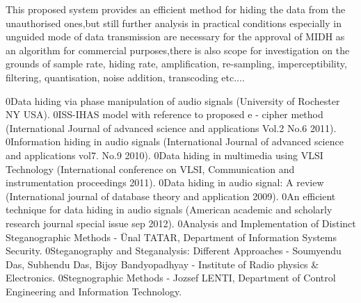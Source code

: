 \documentclass[a4paper, 12pt, notitlepage]{report}
\begin{document}
This  proposed  system  provides  an  efficient  method  for hiding  the  data  from  the  unauthorised ones,but still further analysis in practical conditions especially in unguided mode of data transmission are necessary for the approval of MIDH as an algorithm for commercial purposes,there is also scope for investigation on the grounds of sample rate, hiding rate, amplification, re-sampling, imperceptibility, filtering, quantisation, noise addition, transcoding etc....

\begin{thebibliography}{breitestes Label}

\bibitem 0Data hiding via phase manipulation of audio signals (University of Rochester NY USA).
\bibitem 0ISS-IHAS model with reference to proposed e - cipher method  (International Journal of advanced science and applications Vol.2 No.6 2011).
\bibitem 0Information hiding in audio signals (International Journal of advanced science and applications vol7. No.9 2010).
\bibitem 0Data hiding in multimedia using VLSI Technology (International conference on VLSI, Communication and instrumentation proceedings 2011).
\bibitem 0Data hiding in audio signal: A review (International journal of database theory and application 2009).
\bibitem 0An efficient technique for data hiding in audio signals (American academic and scholarly research journal special issue sep 2012).
\bibitem 0Analysis and Implementation of Distinct Steganographic Methods - Ünal TATAR, Department of Information Systems Security.                                    
\bibitem 0Steganography and Steganalysis: Different Approaches - Soumyendu Das, Subhendu Das, Bijoy Bandyopadhyay - Institute of Radio physics & Electronics.
\bibitem 0Stegnographic Methods - Jozsef LENTI, Department of Control Engineering and Information Technology.

\end{thebibliography}
\end{document}
